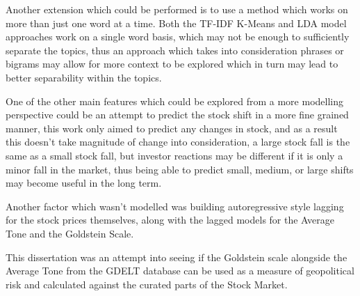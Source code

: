 Another extension which could be performed is to use a method which works on more than just one word at a time. Both the TF-IDF K-Means and LDA model approaches work on a single word basis, which may not be enough to sufficiently separate the topics, thus an approach which takes into consideration phrases or bigrams may allow for more context to be explored which in turn may lead to better separability within the topics. 

One of the other main features which could be explored from a more modelling perspective could be an attempt to predict the stock shift in a more fine grained manner, this work only aimed to predict any changes in stock, and as a result this doesn't take magnitude of change into consideration, a large stock fall is the same as a small stock fall, but investor reactions may be different if it is only a minor fall in the market, thus being able to predict small, medium, or large shifts may become useful in the long term. 

Another factor which wasn't modelled was building autoregressive style lagging for the stock prices themselves, along with the lagged models for the Average Tone and the Goldstein Scale. 

This dissertation was an attempt into seeing if the Goldstein scale alongside the Average Tone from the GDELT database can be used as a measure of geopolitical risk and calculated against the curated parts of the Stock Market. 